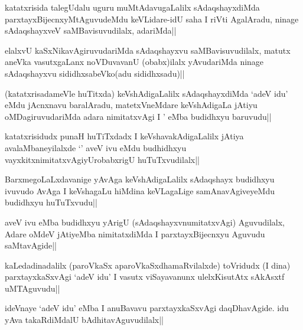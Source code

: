 
\begin{artha}
katatxrisida talegUdalu uguru muMtAdavugaLalilx sAdaqshayxdiMda parxtayxBijecnxyMtAguvudeMdu keVLidare-idU saha I riVti AgalAradu, ninage sAdaqshayxveV saMBavisuvudilalx, adariMda||
\end{artha}

\begin{artha}
elalxvU kaSxNikavAgiruvudariMda sAdaqshayxvu saMBavisuvudilalx, matutx aneVka vasutxgaLanx noVDuvavanU (obabx)ilalx yAvudariMda ninage sAdaqshayxvu sididhxsabeVko(adu sididhxsadu)||
\end{artha}


\begin{artha}
(katatxrisadameVle huTitxda) keVshAdigaLalilx sAdaqshayxdiMda `adeV idu' eMdu jAcnxnavu baralAradu, matetxVneMdare keVshAdigaLa jAtiyu oMDagiruvudariMda adara nimitatxvAgi I \stext' eMba budidhxyu baruvudu||
\end{artha}

\begin{artha}
katatxrisidudx punaH huTiTxdadx I keVshavakAdigaLalilx jAtiya avalaMbaneyilalxde `\stext' aveV ivu eMdu budhidhxyu vayxkitxnimitatxvAgiyUrobabxrigU huTuTxvudilalx||
\end{artha}

\begin{artha}
BarxmegoLaLxdavanige yAvAga keVshAdigaLalilx sAdaqshayx budidhxyu ivuvudo AvAga I keVshagaLu hiMdina keVLagaLige samAnavAgiveyeMdu budidhxyu huTuTxvudu||
\end{artha}

\begin{artha}
aveV ivu eMba budidhxyu yArigU (sAdaqshayxvnumitatxvAgi) Aguvudilalx, Adare oMdeV jAtiyeMba nimitatxdiMda I parxtayxBijecnxyu Aguvudu saMtavAgide||
\end{artha}

\begin{artha}
kaLedadinadalilx (paroVkaSx aparoVkaSxdhamaRvilalxde) toVridudx (I dina) parxtayxkaSxvAgi `adeV idu' I vasutx viSayavanunx ulelxKisutAtx sAkAsxtf uMTAguvudu||
\end{artha}

\begin{artha}
ideVnaye `adeV idu' eMba I anuBavavu parxtayxkaSxvAgi daqDhavAgide. idu yAva takaRdiMdalU bAdhitavAguvudilalx||
\end{artha}

